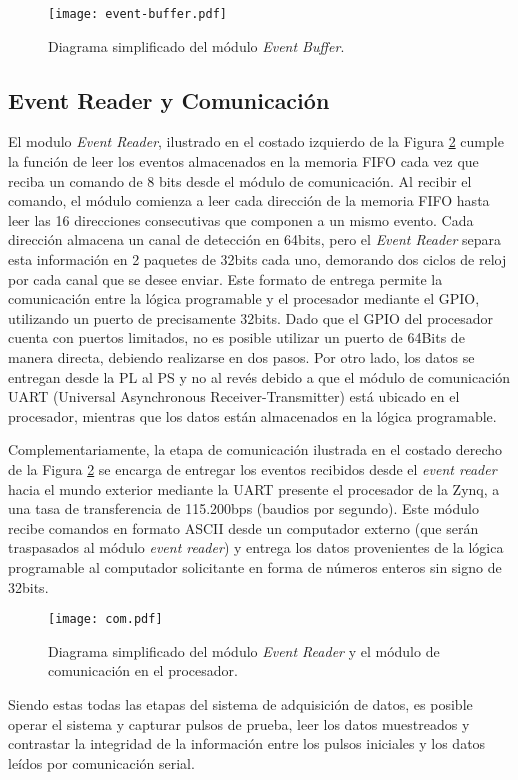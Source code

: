 	\begin{figure}[H]
		\centering
		\texttt{[image: event-buffer.pdf]}
		\caption{Diagrama simplificado del módulo \textit{Event Buffer}.}
		\label{fig:event-buffer}
	\end{figure}
	
	\subsection{Event Reader y Comunicación}
	\label{sec:comm}
	El modulo \textit{Event Reader}, ilustrado en el costado izquierdo de la Figura \ref{fig:com} cumple la función de leer los eventos almacenados en la memoria FIFO cada vez que reciba un comando de 8 bits desde el módulo de comunicación. Al recibir el comando, el módulo comienza a leer cada dirección de la memoria FIFO hasta leer las 16 direcciones consecutivas que componen a un mismo evento. Cada dirección almacena un canal de detección en 64bits, pero el \textit{Event Reader} separa esta información en 2 paquetes de 32bits cada uno, demorando dos ciclos de reloj por cada canal que se desee enviar. Este formato de entrega permite la comunicación entre la lógica programable y el procesador mediante el GPIO, utilizando un puerto de precisamente 32bits. Dado que el GPIO del procesador cuenta con puertos limitados, no es posible utilizar un puerto de 64Bits de manera directa, debiendo realizarse en dos pasos. Por otro lado, los datos se entregan desde la PL al PS y no al revés debido a que el módulo de comunicación UART (Universal Asynchronous Receiver-Transmitter) está ubicado en el procesador, mientras que los datos están almacenados en la lógica programable.
	 
	Complementariamente, la etapa de comunicación ilustrada en el costado derecho de la Figura \ref{fig:com} se encarga de entregar los eventos recibidos desde el \textit{event reader} hacia el mundo exterior mediante la UART presente el procesador de la Zynq, a una tasa de transferencia de 115.200bps (baudios por segundo). Este módulo recibe comandos en formato ASCII desde un computador externo (que serán traspasados al módulo \textit{event reader}) y entrega los datos provenientes de la lógica programable al computador solicitante en forma de números enteros sin signo de 32bits.
	
	\begin{figure}[H]
		\centering
		\texttt{[image: com.pdf]}
		\caption{Diagrama simplificado del módulo \textit{Event Reader} y el módulo de comunicación en el procesador.}
		\label{fig:com}
	\end{figure}
	
	Siendo estas todas las etapas del sistema de adquisición de datos, es posible operar el sistema y capturar pulsos de prueba, leer los datos muestreados y contrastar la integridad de la información entre los pulsos iniciales y los datos leídos por comunicación serial.
	
	
	
